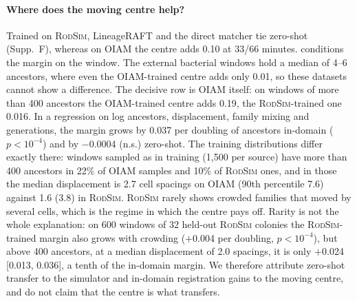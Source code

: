 \documentclass[10pt,twocolumn,letterpaper]{article}
\newcommand{\ours}{LineageRAFT\xspace}
\newcommand{\rodsim}{\textsc{RodSim}\xspace}
\begin{document}
\paragraph{Where does the moving centre help?}
Trained on \rodsim, \ours and the direct matcher tie zero-shot (Supp.~F), whereas on OIAM the centre adds 0.10 at 33/66 minutes.  conditions the margin on the window. The external bacterial windows hold a median of 4--6 ancestors, where even the OIAM-trained centre adds only 0.01, so these datasets cannot show a difference. The decisive row is OIAM itself: on windows of more than 400 ancestors the OIAM-trained centre adds 0.19, the \rodsim-trained one 0.016. In a regression on log ancestors, displacement, family mixing and generations, the margin grows by 0.037 per doubling of ancestors in-domain ($p{<}10^{-4}$) and by $-$0.0004 (n.s.) zero-shot. The training distributions differ exactly there: windows sampled as in training (1{,}500 per source) have more than 400 ancestors in 22\% of OIAM samples and 10\% of \rodsim ones, and in those the median displacement is 2.7 cell spacings on OIAM (90th percentile 7.6) against 1.6 (3.8) in \rodsim. \rodsim rarely shows crowded families that moved by several cells, which is the regime in which the centre pays off. Rarity is not the whole explanation: on 600 windows of 32 held-out \rodsim colonies the \rodsim-trained margin also grows with crowding ($+$0.004 per doubling, $p{<}10^{-4}$), but above 400 ancestors, at a median displacement of 2.0 spacings, it is only $+$0.024 [0.013, 0.036], a tenth of the in-domain margin. We therefore attribute zero-shot transfer to the simulator and in-domain registration gains to the moving centre, and do not claim that the centre is what transfers.

\end{document}
